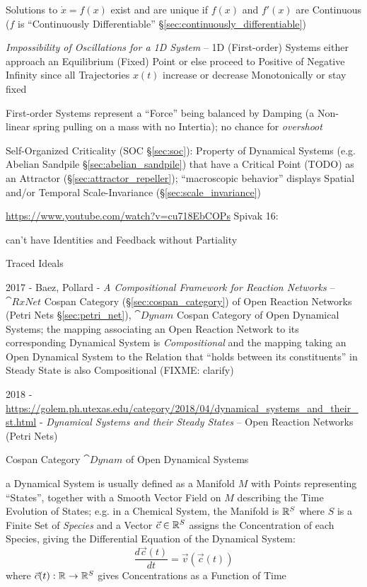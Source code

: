 Solutions to $\dot{x} = f(x)$ exist and are unique if $f(x)$ and $f'(x)$ are
Continuous ($f$ is ``Continuously Differentiable''
\S\ref{sec:continuously_differentiable})

\emph{Impossibility of Oscillations for a 1D System} -- 1D (First-order)
Systems either approach an Equilibrium (Fixed) Point or else proceed to
Positive of Negative Infinity since all Trajectories $x(t)$ increase or
decrease Monotonically or stay fixed

First-order Systems represent a ``Force'' being balanced by Damping (a
Non-linear spring pulling on a mass with no Intertia); no chance for
\emph{overshoot}

\asterism

\fist Self-Organized Criticality (SOC \S\ref{sec:soc}): Property of Dynamical
Systems (e.g. Abelian Sandpile \S\ref{sec:abelian_sandpile}) that have a
Critical Point (TODO) as an Attractor (\S\ref{sec:attractor_repeller});
``macroscopic behavior'' displays Spatial and/or Temporal Scale-Invariance
(\S\ref{sec:scale_invariance})

\asterism

\url{https://www.youtube.com/watch?v=cu718EbCOPs} Spivak 16:

can't have Identities and Feedback without Partiality %

Traced Ideals %

2017 - Baez, Pollard - \emph{A Compositional Framework for Reaction Networks}
-- $\cat{RxNet}$ Cospan Category (\S\ref{sec:cospan_category}) of Open Reaction
Networks (Petri Nets \S\ref{sec:petri_net}), $\cat{Dynam}$ Cospan Category of
Open Dynamical Systems; the mapping associating an Open Reaction Network to its
corresponding Dynamical System is \emph{Compositional} and the mapping taking
an Open Dynamical System to the Relation that ``holds between its
constituents'' in Steady State is also Compositional (FIXME: clarify)

2018 - \url{https://golem.ph.utexas.edu/category/2018/04/dynamical_systems_and_their_st.html} -
\emph{Dynamical Systems and their Steady States} -- Open Reaction Networks
(Petri Nets)

Cospan Category $\cat{Dynam}$ of Open Dynamical Systems

a Dynamical System is usually defined as a Manifold $M$ with Points
representing ``States'', together with a Smooth Vector Field on $M$ describing
the Time Evolution of States; e.g. in a Chemical System, the Manifold is
$\mathbb{R}^S$ where $S$ is a Finite Set of \emph{Species} and a Vector $\vec{c}
\in \mathbb{R}^S$ assigns the Concentration of each Species, giving the
Differential Equation of the Dynamical System:
\[
  \frac{d\vec{c}(t)}{dt} = \vec{v}(\vec{c}(t))
\]
where $\vec{c}(t) : \mathbb{R} \rightarrow \mathbb{R}^S$ gives Concentrations as a
Function of Time

